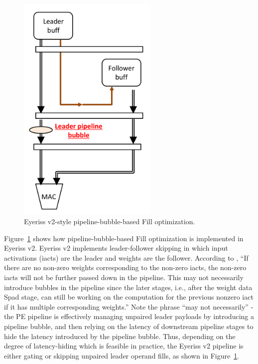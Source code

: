 \begin{figure}[ht]
    \centering
    \includegraphics[width=0.6\textwidth]{figures/pipeline_bubble.pdf}
    \caption{Eyeriss v2\cite{eyerissv2}-style pipeline-bubble-based Fill optimization.}
    \label{fig:pipeline_bubble}
\end{figure}

Figure~\ref{fig:pipeline_bubble} shows how pipeline-bubble-based Fill optimization is implemented in Eyeriss v2\cite{eyerissv2}. Eyeriss v2 implements leader-follower skipping in which input activations (iacts) are the leader and weights are the follower. According to \cite{eyerissv2}, ``If there are no non-zero weights corresponding to the non-zero iacts, the non-zero iacts will not be further passed down in the pipeline. This may not necessarily introduce bubbles in the pipeline since the later stages, i.e., after the weight data Spad stage, can still be working on the computation for the previous nonzero iact if it has multiple corresponding weights.'' Note the phrase ``may not necessarily'' - the PE pipeline is effectively managing unpaired leader payloads by introducing a pipeline bubble, and then relying on the latency of downstream pipeline stages to hide the latency introduced by the pipeline bubble. Thus, depending on the degree of latency-hiding which is feasible in practice, the Eyeriss v2 pipeline is either gating or skipping unpaired leader operand fills, as shown in Figure~\ref{fig:pipeline_bubble}.

